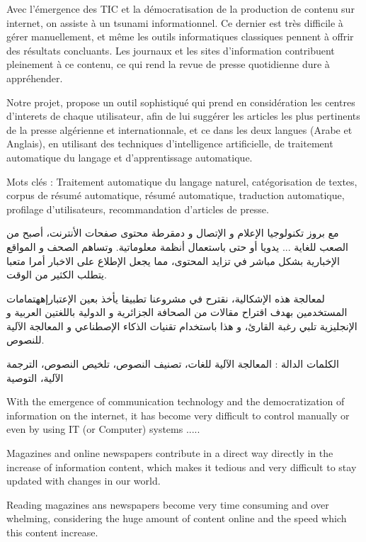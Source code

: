 
\newpage
Avec l'émergence des TIC et la démocratisation de la production de contenu sur internet, on assiste à un tsunami informationnel. Ce dernier est très difficile à gérer manuellement, et même les outils informatiques classiques pennent à offrir des résultats concluants. Les journaux et les sites d'information contribuent pleinement à ce contenu, ce qui rend la revue de presse quotidienne dure à appréhender. 

Notre projet, propose un outil sophistiqué qui prend en considération les centres d'interets de chaque utilisateur, afin de lui suggérer les articles les plus pertinents de la presse algérienne et internationnale, et ce dans les deux langues (Arabe et Anglais), en utilisant des techniques d'intelligence artificielle, de traitement automatique du langage et d'apprentissage automatique. 

Mots clés : Traitement automatique du langage naturel, catégorisation de textes, corpus de résumé
automatique, résumé automatique, traduction automatique, profilage d'utilisateurs, recommandation d'articles de presse.  

\begin{arab}
مع بروز تكنولوجيا الإعلام و الإتصال و دمقرطة محتوى صفحات الأنترنت، أصبح من الصعب للغاية ... يدويا أو حتى باستعمال أنظمة معلوماتية. وتساهم الصحف و المواقع الإخبارية بشكل مباشر في تزايد المحتوى، مما يجعل الإطلاع على الاخبار أمرا متعبا يتطلب الكثير من الوقت. 

لمعالجة هذه الإشكالية، نقترح في مشروعنا تطبيقا يأخذ بعين الإعتبارإههتمامات المستخدمين بهدف اقتراح مقالات من الصحافة الجزائرية و الدولية باللغتين العربية و الإنجليزية تلبي رغبة القارئ، و هذا باستخدام تقنيات الذكاء الإصطناعي و المعالجة الآلية للنصوص.

الكلمات الدالة : المعالجة الآلية للغات،  تصنيف النصوص، تلخيص النصوص، الترجمة الآلية، التوصية  
\end{arab}


With the emergence of communication technology and the democratization of information on the internet, it has become very difficult to control manually or even by using IT (or Computer) systems .....

Magazines and online newspapers contribute in a direct way directly in the increase of information content, which makes it tedious and very difficult to stay updated with changes in our world.

Reading magazines ans newspapers become very time consuming and over whelming, considering the huge amount of content online and the speed which this content increase.

